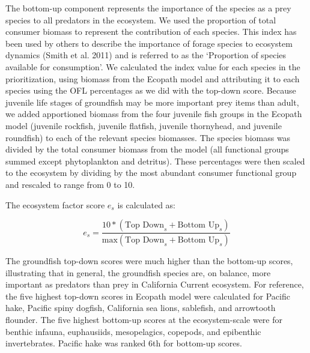 \documentclass[11pt,
  english,
  a4paper,
]{article}
\begin{document}
The bottom-up component represents the importance of the species as a prey species to all predators in the ecosystem. We used the proportion of total consumer biomass to represent the contribution of each species. This index has been used by others to describe the importance of forage species to ecosystem dynamics {(Smith et al. 2011)\leavevmode\tagmcend\tagstructend} and is referred to as the `Proportion of species available for consumption'. We calculated the index value for each species in the prioritization, using biomass from the Ecopath model and attributing it to each species using the OFL percentages as we did with the top-down score. Because juvenile life stages of groundfish may be more important prey items than adult, we added apportioned biomass from the four juvenile fish groups in the Ecopath model (juvenile rockfish, juvenile flatfish, juvenile thornyhead, and juvenile roundfish) to each of the relevant species biomasses. The species biomass was divided by the total consumer biomass from the model (all functional groups summed except phytoplankton and detritus). These percentages were then scaled to the ecosystem by dividing by the most abundant consumer functional group and rescaled to range from 0 to 10.

\leavevmode\tagmcend\tagstructend\par


The ecosystem factor score {\(e_s\)\leavevmode\tagmcend\tagstructend} is calculated as:

\leavevmode\tagmcend\tagstructend\par


{\[
e_s = \frac{10*(\text{Top Down}_s + \text{Bottom Up}_s)}{\text{max}(\text{Top Down}_s + \text{Bottom Up}_s)}
\]\leavevmode\tagmcend\tagstructend}

\leavevmode\tagmcend\tagstructend\par


The groundfish top-down scores were much higher than the bottom-up scores, illustrating that in general, the groundfish species are, on balance, more important as predators than prey in California Current ecosystem. For reference, the five highest top-down scores in Ecopath model were calculated for Pacific hake, Pacific spiny dogfish, California sea lions, sablefish, and arrowtooth flounder. The five highest bottom-up scores at the ecosystem-scale were for benthic infauna, euphausiids, mesopelagics, copepods, and epibenthic invertebrates. Pacific hake was ranked 6th for bottom-up scores.
\end{document}
